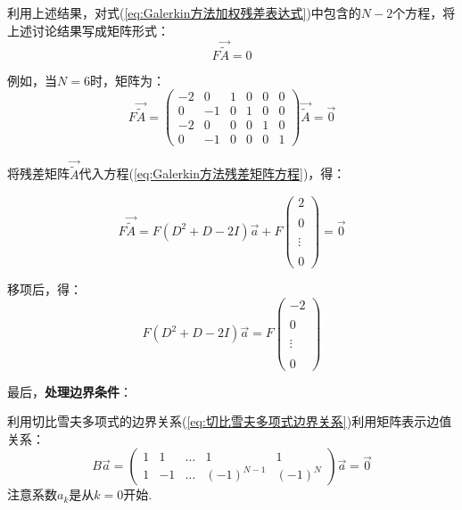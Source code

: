 \documentclass[12pt]{ctexart}
\numberwithin{equation}{section} %
\begin{document}
利用上述结果，对式(\ref{eq:Galerkin方法加权残差表达式})中包含的$N-2$个方程，将上述讨论结果写成矩阵形式：
\begin{equation}
    F\vec{\tilde A}=0
    \label{eq:Galerkin方法残差矩阵方程}
\end{equation}

例如，当$N=6$时，矩阵为：
\begin{equation}
    F\vec{\tilde A}=\left(\begin{array}{cccccc}-2&0&1&0&0&0\\0&-1&0&1&0&0\\-2&0&0&0&1&0\\0&-1&0&0&0&1\end{array}\right)\vec{\tilde A}=\vec0
\end{equation}

将残差矩阵$\vec{\tilde A}$代入方程(\ref{eq:Galerkin方法残差矩阵方程})，得：

\begin{equation}
    F\vec{\tilde A}=F(D^2+D-2I)\vec{a}+F\left(\begin{array}{c}2\\\\0\\\\\vdots\\\\0\end{array}\right)=\vec0
\end{equation}

移项后，得：
\begin{equation}
    F(D^2+D-2I)\vec{a}=F\begin{pmatrix}-2\\\\0\\\\\vdots\\\\0\end{pmatrix}
\end{equation}

最后，\textbf{处理边界条件}：

利用切比雪夫多项式的边界关系(\ref{eq:切比雪夫多项式边界关系})利用矩阵表示边值关系：
\begin{equation}
    B\vec a=\left(\begin{array}{ccccc}1&1&\dots&1&1\\1&-1&\dots&(-1)^{N-1}&(-1)^N\end{array}\right)\vec a=\vec0
\end{equation}
注意系数$a_k$是从$k=0$开始.
\end{document}
